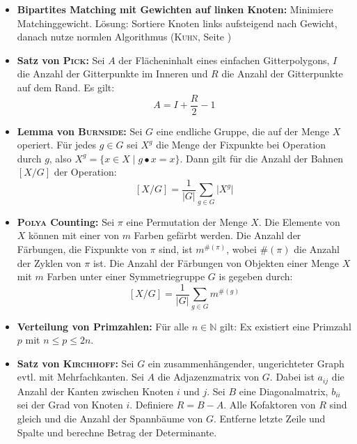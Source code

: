 \begin{itemize}
	\item \textbf{Bipartites Matching mit Gewichten auf linken Knoten:}
	Minimiere Matchinggewicht.
	Lösung: Sortiere Knoten links aufsteigend nach Gewicht, danach nutze normlen Algorithmus (\textsc{Kuhn}, Seite \pageref{kuhn})

	\item \textbf{Satz von \textsc{Pick}:}
	Sei $A$ der Flächeninhalt eines einfachen Gitterpolygons, $I$ die Anzahl der Gitterpunkte im Inneren und $R$ die Anzahl der Gitterpunkte auf dem Rand.
	Es gilt:
	\[
		A = I + \frac{R}{2} - 1
	\]

	\item \textbf{Lemma von \textsc{Burnside}:}
	Sei $G$ eine endliche Gruppe, die auf der Menge $X$ operiert.
	Für jedes $g \in G$ sei $X^g$ die Menge der Fixpunkte bei Operation durch $g$, also $X^g = \{x \in X \mid g \bullet x = x\}$.
	Dann gilt für die Anzahl der Bahnen $[X/G]$ der Operation:
	\[
		[X/G] = \frac{1}{\vert G \vert} \sum_{g \in G} \vert X^g \vert
	\]

	\item \textbf{\textsc{Polya} Counting:}
	Sei $\pi$ eine Permutation der Menge $X$.
	Die Elemente von $X$ können mit einer von $m$ Farben gefärbt werden.
	Die Anzahl der Färbungen, die Fixpunkte von $\pi$ sind, ist $m^{\#(\pi)}$, wobei $\#(\pi)$ die Anzahl der Zyklen von $\pi$ ist.
	Die Anzahl der Färbungen von Objekten einer Menge $X$ mit $m$ Farben unter einer Symmetriegruppe $G$ is gegeben durch:
	\[
		[X/G] = \frac{1}{\vert G \vert} \sum_{g \in G} m^{\#(g)}
	\]

	\item \textbf{Verteilung von Primzahlen:}
	Für alle $n \in \mathbb{N}$ gilt: Ex existiert eine Primzahl $p$ mit $n \leq p \leq 2n$.

	\item \textbf{Satz von \textsc{Kirchhoff}:}
	Sei $G$ ein zusammenhängender, ungerichteter Graph evtl. mit Mehrfachkanten.
	Sei $A$ die Adjazenzmatrix von $G$.
	Dabei ist $a_{ij}$ die Anzahl der Kanten zwischen Knoten $i$ und $j$.
	Sei $B$ eine Diagonalmatrix, $b_{ii}$ sei der Grad von Knoten $i$.
	Definiere $R = B - A$.
	Alle Kofaktoren von $R$ sind gleich und die Anzahl der Spannbäume von $G$.
	\newline
	Entferne letzte Zeile und Spalte und berechne Betrag der Determinante.


\end{itemize}
